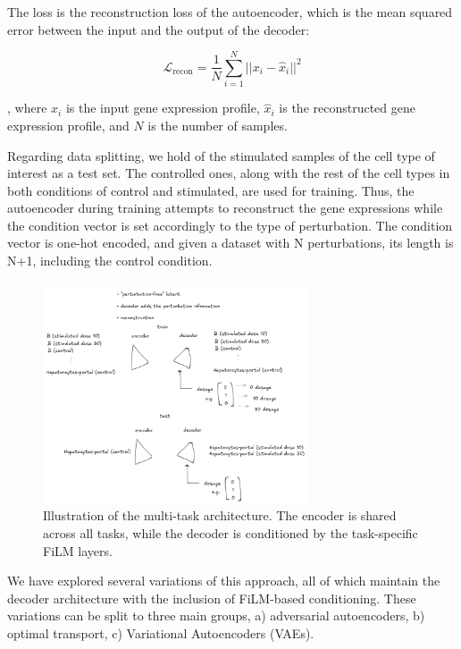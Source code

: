 \documentclass[12pt, a4paper]{article}
\begin{document}
The loss is the reconstruction loss of the autoencoder, which is the mean squared error between the input and the output of the decoder:

\[
\mathcal{L}_{\text{recon}} = \frac{1}{N} \sum_{i=1}^{N} ||x_i - \hat{x}_i||^2 \]


, where $x_i$ is the input gene expression profile, $\hat{x}_i$ is the reconstructed gene expression profile, and $N$ is the number of samples.

Regarding data splitting, we hold of the stimulated samples of the cell type of interest as a test set. The controlled ones, along with the rest of the cell types in both conditions of control and stimulated, are used for training. Thus, the autoencoder during training attempts to reconstruct the gene expressions while the condition vector is set accordingly to the type of perturbation. The condition vector is one-hot encoded, and given a dataset with N perturbations, its length is N+1, including the control condition.

\begin{figure}
    \centering
    \includegraphics[width=0.7\textwidth]{ae_sketch.png}
    \caption{Illustration of the multi-task architecture. The encoder is shared across all tasks, while the decoder is conditioned by the task-specific FiLM layers.}
\end{figure}

We have explored several variations of this approach, all of which maintain the decoder architecture with the inclusion of FiLM-based conditioning. These variations can be split to three main groups, a) adversarial autoencoders, b) optimal transport, c) Variational Autoencoders (VAEs).
\end{document}
